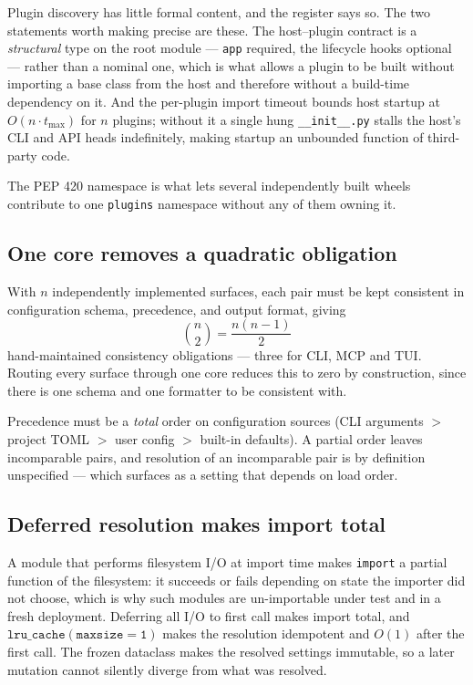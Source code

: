 \documentclass[11pt]{article}
\begin{document}
Plugin discovery has little formal content, and the register says so. The two
statements worth making precise are these. The host--plugin contract is a
\emph{structural} type on the root module --- \texttt{app} required, the
lifecycle hooks optional --- rather than a nominal one, which is what allows a
plugin to be built without importing a base class from the host and therefore
without a build-time dependency on it. And the per-plugin import timeout bounds
host startup at $O(n \cdot t_{\max})$ for $n$ plugins; without it a single hung
\texttt{\_\_init\_\_.py} stalls the host's CLI and API heads indefinitely,
making startup an unbounded function of third-party code.

The PEP 420 namespace is what lets several independently built wheels
contribute to one \texttt{plugins} namespace without any of them owning it.

\subsection{One core removes a quadratic obligation}
\label{lbl:HS-BOUND-04}

With $n$ independently implemented surfaces, each pair must be kept consistent
in configuration schema, precedence, and output format, giving
\begin{equation}
\binom{n}{2} = \frac{n(n-1)}{2}
\end{equation}
hand-maintained consistency obligations --- three for CLI, MCP and TUI. Routing
every surface through one core reduces this to zero by construction, since
there is one schema and one formatter to be consistent with.

Precedence must be a \emph{total} order on configuration sources (CLI arguments
$>$ project TOML $>$ user config $>$ built-in defaults). A partial order leaves
incomparable pairs, and resolution of an incomparable pair is by definition
unspecified --- which surfaces as a setting that depends on load order.

\subsection{Deferred resolution makes import total}
\label{lbl:HS-BOUND-05}

A module that performs filesystem I/O at import time makes \texttt{import} a
partial function of the filesystem: it succeeds or fails depending on state the
importer did not choose, which is why such modules are un-importable under test
and in a fresh deployment. Deferring all I/O to first call makes import total,
and $\mathtt{lru\_cache(maxsize=1)}$ makes the resolution idempotent and $O(1)$
after the first call. The frozen dataclass makes the resolved settings
immutable, so a later mutation cannot silently diverge from what was resolved.
\end{document}
